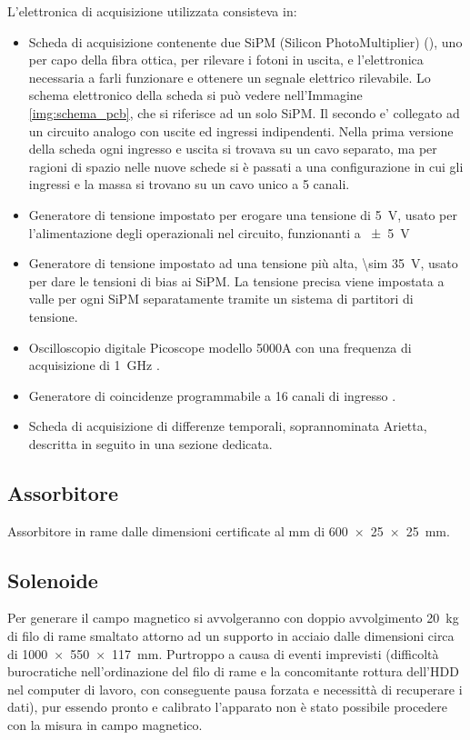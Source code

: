 L'elettronica di acquisizione utilizzata consisteva in:
\begin{itemize}
\item Scheda di acquisizione contenente due SiPM (Silicon PhotoMultiplier) (\cite{bib:SiPM}), uno per capo della fibra ottica, per rilevare i fotoni in uscita, e l'elettronica necessaria a farli funzionare e ottenere un segnale elettrico rilevabile. Lo schema elettronico della scheda si pu\`o vedere nell'Immagine \ref{img:schema_pcb}, che si riferisce ad un solo SiPM. Il secondo e' collegato ad un circuito analogo con uscite ed ingressi indipendenti. Nella prima versione della scheda ogni ingresso e uscita si trovava su un cavo separato, ma per ragioni di spazio nelle nuove schede si \`e passati a una configurazione in cui gli ingressi e la massa si trovano su un cavo unico a 5 canali.


\item Generatore di tensione impostato per erogare una tensione di \SI{5}{\volt}, usato per l'alimentazione degli operazionali nel circuito, funzionanti a \SI{+-5}{\volt}

\item Generatore di tensione impostato ad una tensione pi\`u alta, \SI{\sim 35}{\volt}, usato per dare le tensioni di bias ai SiPM. La tensione precisa viene impostata a valle per ogni SiPM separatamente tramite un sistema di partitori di tensione.

\item Oscilloscopio digitale Picoscope modello 5000A con una frequenza di acquisizione di \SI{1}{\GHz} \cite{bib:datasheet_pico}.

\item Generatore di coincidenze programmabile a 16 canali di ingresso \cite{bib:articolo_garfa}.

\item Scheda di acquisizione di differenze temporali, soprannominata Arietta, descritta in seguito in una  sezione dedicata.

\end{itemize}

\subsection{Assorbitore}
Assorbitore in rame dalle dimensioni certificate al mm di \SI{600x25x25}{\milli\metre}.

\subsection{Solenoide}
Per generare il campo magnetico si avvolgeranno con doppio avvolgimento \SI{20}{\kg} di filo di rame smaltato attorno ad un supporto in acciaio dalle dimensioni circa
di \SI{1000x550x117}{\milli\metre}.
Purtroppo a causa  di eventi imprevisti (difficolt\`a burocratiche nell'ordinazione del filo di rame e la concomitante rottura dell'HDD nel computer di lavoro, con conseguente pausa forzata e necessitt\`a di recuperare i dati), pur essendo pronto e calibrato l'apparato non \`e stato possibile procedere con la misura in campo magnetico.

